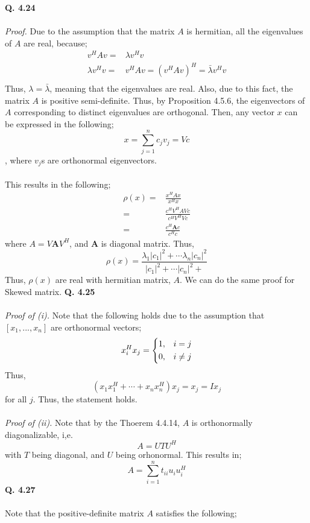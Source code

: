 \documentclass[letterpaper,12pt]{article}
\theoremstyle{definition}
\begin{document}
\textbf{Q. 4.24}\\\\
\emph{Proof.} Due to the assumption that the matrix $A$ is hermitian, all the eigenvalues of $A$ are real, because;
\begin{align*}
  v^H A v =& \lambda v^H v \\
  \lambda v^H v =& v^H Av = (v^H A v)^H  = \bar{\lambda} v^H v\\
\end{align*}
Thus, $\lambda = \bar{\lambda}$, meaning that the eigenvalues are real. Also, due to this fact, the matrix $A$ is positive semi-definite.  Thus, by Proposition 4.5.6, the eigenvectors of $A$ corresponding to distinct eigenvalues are orthogonal. Then, any vector $x$ can be expressed in the following;
\[x = \sum_{j=1}^{n} c_j v_j = Vc \], where $v_j$s are orthonormal eigenvectors.  \\\\
This results in the following;
\begin{align*}
  \rho(x) =& \frac{x^H A x}{x^H x}  \\
   =& \frac{c^H V^H A V c}{c^H V^H V c}  \\
   =& \frac{c^H \textbf{A} c}{c^H c}
\end{align*}
where $A = V \textbf{A} V^H$, and $\textbf{A}$ is diagonal matrix. Thus,
\[\rho(x) = \frac{\lambda_1 |c_1|^2 + \cdots \lambda_n |c_n|^2 }{|c_1|^2 + \cdots |c_n|^2 +} \]
Thus, $\rho(x)$ are real with hermitian matrix, $A$.
We can do the same proof for Skewed matrix.
\textbf{Q. 4.25}\\\\
\emph{Proof of (i).} Note that the following holds due to the assumption that $[x_1, ..., x_n]$ are orthonormal vectors;
\[
x_{i}^H x_{j}=
\begin{dcases}
1, & i=j \\
0, & i \neq j
\end{dcases}
\]
Thus,
\[(x_1 x_{1}^H + \cdots + x_n x_{n}^H) x_j = x_j = I x_j  \]
for all $j$. Thus, the statement holds. \\\\
\emph{Proof of (ii). } Note that by the Thoerem 4.4.14, $A$ is orthonormally diagonalizable, i,e.
\[ A = U T U^H\]
with $T$ being diagonal, and $U$ being orhonormal. This results in;\\
\[A = \sum_{i=1}^{n} t_{ii} u_i u_{i}^{H}\]
\textbf{Q. 4.27}\\\\
Note that the positive-definite matrix $A$ satisfies the following; \\
\end{document}
